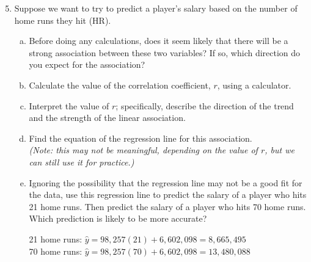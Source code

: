 \begin{enumerate}
\setcounter{enumi}{4}
\item Suppose we want to try to predict a player's salary based on the number of home runs they hit (HR).
\begin{enumerate}[(a)]
\item Before doing any calculations, does it seem likely that there will be a strong association between these two variables?  If so, which direction do you expect for the association? 
\item Calculate the value of the correlation coefficient, $r$, using a calculator. 
\item Interpret the value of $r$; specifically, describe the direction of the trend and the strength of the linear association. 
\item Find the equation of the regression line for this association.\\
\emph{(Note: this may not be meaningful, depending on the value of $r$, but we can still use it for practice.)} 
\item Ignoring the possibility that the regression line may not be a good fit for the data, use this regression line to predict the salary of a player who hits 21 home runs.  Then predict the salary of a player who hits 70 home runs.  Which prediction is likely to be more accurate? 
\begin{center}
21 home runs: $\hat{y} = 98,257(21) + 6,602,098 = 8,665,495$\\
70 home runs: $\hat{y} = 98,257(70) + 6,602,098 = 13,480,088$
\end{center}
\end{enumerate}


\end{enumerate}
